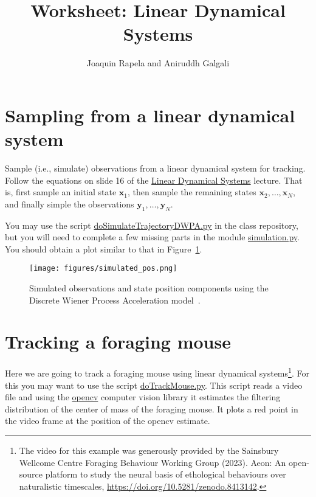 \documentclass[12pt]{article}
\title{Worksheet: Linear Dynamical Systems}
\author{Joaquin Rapela and Aniruddh Galgali}
\begin{document}
\maketitle

\section{Sampling from a linear dynamical system}

Sample (i.e., simulate) observations from a linear dynamical system for
tracking.  Follow the equations on slide 16 of the
\href{https://github.com/joacorapela/neuroinformatics24/blob/master/lectures/07_linearDynamicalSystems/LDS_SWCNeuroinf2024.pdf}{Linear
Dynamical Systems} lecture. That is, first sample an initial state
$\mathbf{x}_1$, then sample the remaining states
$\mathbf{x}_2,\ldots,\mathbf{x}_N$, and finally simple the observations
$\mathbf{y}_1,\ldots,\mathbf{y}_N$.

You may use the script
\href{https://github.com/joacorapela/neuroinformatics24/blob/master/worksheets/07_linearDynamicalSystems/code/scripts/doSimulateTrajectoryDWPA.py}{doSimulateTrajectoryDWPA.py}
in the class repository, but you will need to complete a few missing parts in
the module
\href{https://github.com/joacorapela/neuroinformatics24/blob/master/worksheets/07_linearDynamicalSystems/code/src/simulation.py}{simulation.py}.
You should obtain a plot similar to that in Figure~\ref{fig:simulated_pos}.

\begin{figure}
	\begin{center}
		\texttt{[image: figures/simulated\_pos.png]}
		\label{fig:simulated_pos}
		\caption{Simulated observations and state position components
              using the Discrete Wiener Process Acceleration
              model~\citep[][Section 6.3.3]{barShalomEtAl04}.}
	\end{center}
\end{figure}

\section{Tracking a foraging mouse}

Here we are going to track a foraging mouse using linear dynamical
systems\footnote{The video for this example was generously provided by the
Sainsbury Wellcome Centre Foraging Behaviour Working Group (2023). Aeon: An
open-source platform to study the neural basis of ethological behaviours over
naturalistic timescales, \url{https://doi.org/10.5281/zenodo.8413142}.}. For
this you may want to use the script
\href{https://github.com/joacorapela/neuroinformatics24/blob/master/worksheets/07_linearDynamicalSystems/code/scripts/doTrackMouse.py}{doTrackMouse.py}.
This script reads a video file and using the \href{https://opencv.org/}{opencv}
computer vision library it estimates the filtering distribution of the center of
mass of the foraging mouse. It plots a red point in the video frame at the
position of the opencv estimate.
\end{document}
